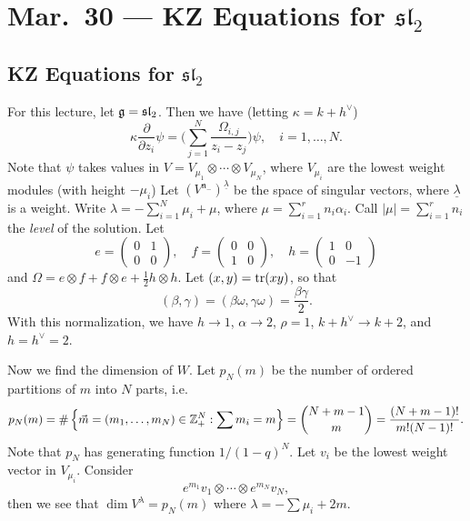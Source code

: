 \chapter{Mar.~30 --- KZ Equations for \texorpdfstring{$\mathfrak{sl}_2$}{sl2}}

\section{KZ Equations for \texorpdfstring{$\mathfrak{sl}_2$}{sl2}}
\begin{remark}
  For this lecture, let
  $\mathfrak{g} = \mathfrak{sl}_2$. Then we have
  (letting $\kappa = k + h^\vee$)
  \[
    \kappa \frac{\partial}{\partial z_i} \psi
    = \bigg(
      \sum_{j = 1}^N \frac{\Omega_{i, j}}{z_i - z_j}
    \bigg) \psi, \quad i = 1, \dots, N.
  \]
  Note that
  $\psi$ takes values in
  $V = V_{\mu_1} \otimes \cdots \otimes V_{\mu_{N }}$,
  where $V_{\mu_i}$ are the lowest
  weight modules (with height $-\mu_i$)
  Let $(V^{\mathfrak{n}_-})^{\underline{\lambda}}$
  be the space of singular vectors, where
  $\underline{\lambda}$ is a weight.
  Write $\lambda = -\sum_{i = 1}^N \mu_i + \mu$,
  where $\mu = \sum_{i = 1}^r n_i \alpha_i$.
  Call $|\mu| = \sum_{i = 1}^r n_i$ the
  \emph{level} of the solution. Let
  \[
    e =
    \begin{pmatrix}
      0 & 1 \\
      0 & 0
    \end{pmatrix}, \quad
    f =
    \begin{pmatrix}
      0 & 0 \\
      1 & 0
    \end{pmatrix}, \quad
    h =
    \begin{pmatrix}
      1 & 0 \\
      0 & -1
    \end{pmatrix}
  \]
  and $\Omega = e \otimes f + f \otimes e + \frac{1}{2} h \otimes h$.
  Let $(x, y) = \operatorname{tr}(xy)$, so that
  \[
    (\beta, \gamma)
    = (\beta \omega, \gamma \omega)
    = \frac{\beta \gamma}{2}.
  \]
  With this normalization, we have
  $h \to 1$, $\alpha \to 2$, $\rho = 1$,
  $k + h^\vee \to k + 2$, and
  $h = h^\vee = 2$.

  Now we find the dimension of $W$.
  Let $p_N(m)$ be the number of ordered
  partitions of $m$ into $N$ parts, i.e.
  \[
    p_N(m)
    = 
    \#\left\{\vec{m} = (m_1, \dots, m_N) \in \mathbb{Z}_+^N : \sum m_i = m\right\}
    = \binom{N + m - 1}{m}
    = \frac{(N + m - 1)!}{m! (N - 1)!}.
  \]
  Note that $p_N$ has generating function
  $1 / (1 - q)^N$. Let $v_i$ be the lowest
  weight vector in $V_{\mu_i}$. Consider
  \[
    e^{m_1} v_1 \otimes \cdots \otimes e^{m_N} v_N,
  \]
  then we see that $\dim V^\lambda = p_N(m)$
  where $\lambda = - \sum \mu_i + 2m$.
\end{remark}

